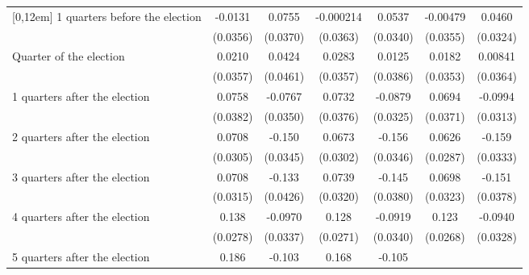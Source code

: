 \begin{table}[!ht]
\begin{tabular}{l*{6}{c}}
[0,12em]
 1 quarters before the election&     -0.0131         &      0.0755\sym{*}  &   -0.000214         &      0.0537         &    -0.00479         &      0.0460         \\
                    &    (0.0356)         &    (0.0370)         &    (0.0363)         &    (0.0340)         &    (0.0355)         &    (0.0324)         \\
[0,12em]
Quarter of the election&      0.0210         &      0.0424         &      0.0283         &      0.0125         &      0.0182         &     0.00841         \\
                    &    (0.0357)         &    (0.0461)         &    (0.0357)         &    (0.0386)         &    (0.0353)         &    (0.0364)         \\
[0,12em]
 1 quarters after the election&      0.0758\sym{*}  &     -0.0767\sym{*}  &      0.0732         &     -0.0879\sym{**} &      0.0694         &     -0.0994\sym{**} \\
                    &    (0.0382)         &    (0.0350)         &    (0.0376)         &    (0.0325)         &    (0.0371)         &    (0.0313)         \\
[0,12em]
 2 quarters after the election&      0.0708\sym{*}  &      -0.150\sym{***}&      0.0673\sym{*}  &      -0.156\sym{***}&      0.0626\sym{*}  &      -0.159\sym{***}\\
                    &    (0.0305)         &    (0.0345)         &    (0.0302)         &    (0.0346)         &    (0.0287)         &    (0.0333)         \\
[0,12em]
 3 quarters after the election&      0.0708\sym{*}  &      -0.133\sym{**} &      0.0739\sym{*}  &      -0.145\sym{***}&      0.0698\sym{*}  &      -0.151\sym{***}\\
                    &    (0.0315)         &    (0.0426)         &    (0.0320)         &    (0.0380)         &    (0.0323)         &    (0.0378)         \\
[0,12em]
 4 quarters after the election&       0.138\sym{***}&     -0.0970\sym{**} &       0.128\sym{***}&     -0.0919\sym{**} &       0.123\sym{***}&     -0.0940\sym{**} \\
                    &    (0.0278)         &    (0.0337)         &    (0.0271)         &    (0.0340)         &    (0.0268)         &    (0.0328)         \\
[0,12em]
 5 quarters after the election&       0.186\sym{***}&      -0.103\sym{**} &       0.168\sym{***}&      -0.105\sym{**} &                     &                     \\

\end{tabular}
\end{table}
